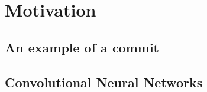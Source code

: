 \section{Motivation}
\label{sec:motivation}

\subsection{An example of a commit }
\label{sec:examle}

\subsection{Convolutional Neural Networks}
\label{sec:background_cnn}

